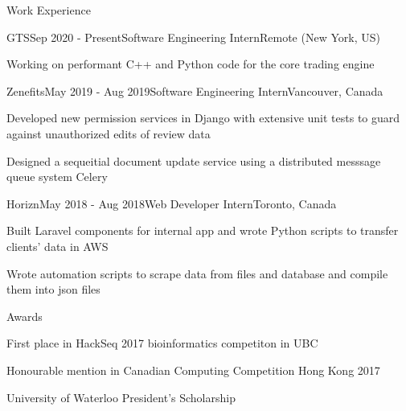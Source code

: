 \documentclass{cv}
\begin{document}
\begin{rSection}{Work Experience}
\begin{rSubsection}{GTS}{Sep 2020 - Present}{Software Engineering Intern}{Remote (New York, US)}
	\item Working on performant C++ and Python code for the core trading engine
\end{rSubsection}

\begin{rSubsection}{Zenefits}{May 2019 - Aug 2019}{Software Engineering Intern}{Vancouver, Canada}
	\item Developed new permission services in Django with extensive unit tests to guard against unauthorized edits of review data
	\item Designed a sequeitial document update service using a distributed messsage queue system Celery
\end{rSubsection}

\begin{rSubsection}{Horizn}{May 2018 - Aug 2018}{Web Developer Intern}{Toronto, Canada}
	\item Built Laravel components for internal app and wrote Python scripts to transfer clients’ data in AWS
	\item Wrote automation scripts to scrape data from files and database and compile them into json files
\end{rSubsection}
\end{rSection}

\begin{rSection}{Awards}
\begin{rSubsectionPure}
	\item First place in HackSeq 2017 bioinformatics competiton in UBC
	\item Honourable mention in Canadian Computing Competition Hong Kong 2017
	\item University of Waterloo President's Scholarship
\end{rSubsectionPure}
\end{rSection}
\end{document}
